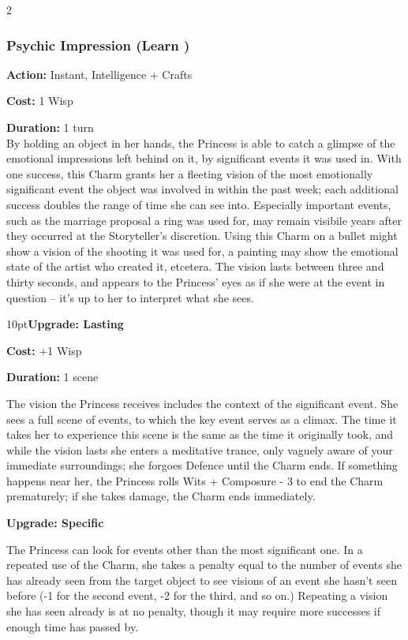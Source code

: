 \begin{multicols}{2}
\subsubsection*{Psychic Impression (Learn \textbullet\textbullet\textbullet)}

\noindent \textbf{Action:} Instant, Intelligence + Crafts

\noindent \textbf{Cost:} 1 Wisp

\noindent \textbf{Duration:} 1 turn \\

\noindent By holding an object in her hands, the Princess is able to catch a glimpse of the emotional impressions left behind on it, by significant events it was used in. With one success, this Charm grants her a fleeting vision of the most emotionally significant event the object was involved in within the past week; each additional success doubles the range of time she can see into. Especially important events, such as the marriage proposal a ring was used for, may remain visibile years after they occurred at the Storyteller's discretion. Using this Charm on a bullet might show a vision of the shooting it was used for, a painting may show the emotional state of the artist who created it, etcetera. The vision lasts between three and thirty seconds, and appears to the Princess' eyes as if she were at the event in question -- it's up to her to interpret what she sees.

\begin{myindentpar}{10pt}\textbf{Upgrade: Lasting}

\noindent \textbf{Cost:} +1 Wisp

\noindent \textbf{Duration:} 1 scene 

The vision the Princess receives includes the context of the significant event. She sees a full scene of events, to which the key event serves as a climax. The time it takes her to experience this scene is the same as the time it originally took, and while the vision lasts she enters a meditative trance, only vaguely aware of your immediate surroundings; she forgoes Defence until the Charm ends. If something happens near her, the Princess rolls Wits + Composure - 3 to end the Charm prematurely; if she takes damage, the Charm ends immediately.

\textbf{Upgrade: Specific}

The Princess can look for events other than the most significant one. In a repeated use of the Charm, she takes a penalty equal to the number of events she has already seen from the target object to see visions of an event she hasn't seen before (-1 for the second event, -2 for the third, and so on.) Repeating a vision she has seen already is at no penalty, though it may require more successes if enough time has passed by.\end{myindentpar}



\end{multicols}
